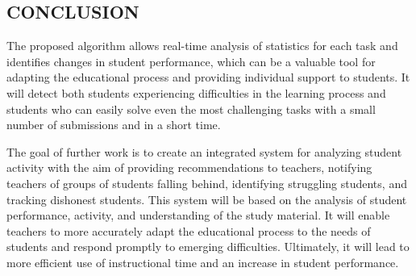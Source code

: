 \documentclass[letterpaper]{article}
\begin{document}
\begin{multicols}{2}
\begin{justify}
      \section{CONCLUSION}
      The proposed algorithm allows real-time analysis of statistics for each task and identifies changes in student performance, which can be a valuable tool for adapting the educational process and providing individual support to students. It will detect both students experiencing difficulties in the learning process and students who can easily solve even the most challenging tasks with a small number of submissions and in a short time.

      The goal of further work is to create an integrated system for analyzing student activity with the aim of providing recommendations to teachers, notifying teachers of groups of students falling behind, identifying struggling students, and tracking dishonest students. This system will be based on the analysis of student performance, activity, and understanding of the study material. It will enable teachers to more accurately adapt the educational process to the needs of students and respond promptly to emerging difficulties. Ultimately, it will lead to more efficient use of instructional time and an increase in student performance. 

    \end{justify}
  \end{multicols}      
\end{document}
